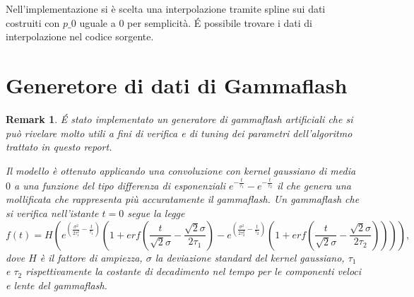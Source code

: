 \documentclass[10pt,a4paper]{report}
\newtheorem{remark}{Remark}
\begin{document}
Nell'implementazione si è scelta una interpolazione tramite spline sui dati costruiti con $p\_0$ uguale a $0$ per semplicità. \'E possibile trovare i dati di interpolazione nel codice sorgente.

\section{Generetore di dati di Gammaflash}
\begin{remark}
\'E stato implementato un generatore di gammaflash artificiali che si può rivelare molto utili a fini di verifica e di tuning dei parametri dell'algoritmo trattato in questo report.

Il modello è ottenuto applicando una convoluzione con kernel gaussiano di media $0$ a una funzione del tipo differenza di esponenziali $e^{-\frac{t}{\tau_1}}-e^{-\frac{t}{\tau_2}}$ il che genera una mollificata che rappresenta più accuratamente il gammaflash. 
Un gammaflash che si verifica nell'istante $t=0$ segue la legge
$$
f(t) = H \left(e^{\left(\frac{\sigma^2}{2\tau_1^2}-\frac{t}{\tau_1}\right)}\left(1+erf\left(\frac{t}{\sqrt{2}\sigma}-\frac{\sqrt{2}\sigma}{2\tau_1}\right)-e^{\left(\frac{\sigma^2}{2\tau_2^2}-\frac{t}{\tau_2}\right)}\left(1+erf\left(\frac{t}{\sqrt{2}\sigma}-\frac{\sqrt{2}\sigma}{2\tau_2}\right)\right)\right)\right),
$$
dove $H$ è il fattore di ampiezza, $\sigma$ la deviazione standard del kernel gaussiano, $\tau_1$ e $\tau_2$ rispettivamente la costante di decadimento nel tempo per le componenti veloci e lente del gammaflash.


\end{remark}
\end{document}
